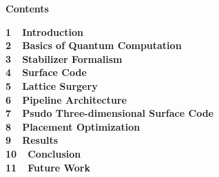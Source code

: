 \documentclass[a4paper,11pt]{ltjsarticle}
\begin{document}
\huge\bfseries{Contents}

\vspace{10pt}
\Large\bfseries{
1\ \ Introduction\\
2\ \ Basics of Quantum Computation\\
3\ \ Stabilizer Formalism\\
4\ \ Surface Code\\
5\ \ Lattice Surgery\\
6\ \ Pipeline Architecture\\
7\ \ Psudo Three-dimensional Surface Code\\
8\ \ Placement Optimization\\
9\ \ Results\\
10\ \ Conclusion\\
11\ \ Future Work\\
}
\end{document}
